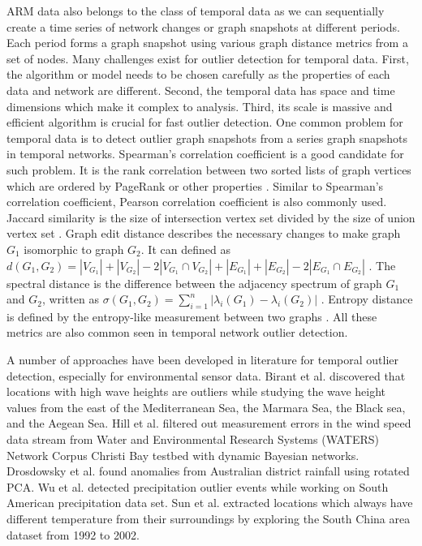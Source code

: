ARM data also belongs to the class of temporal data as we can sequentially create a
time series of network changes or graph snapshots at different periods.
Each period forms a graph snapshot using various graph distance metrics
from a set of nodes. Many challenges exist for outlier detection for
temporal data. First, the algorithm or model needs to be chosen
carefully as the properties of each data and network are different.
Second, the temporal data has space and time dimensions which make it
complex to analysis. Third, its scale is massive and efficient algorithm
is crucial for fast outlier detection. One common problem for temporal
data is to detect outlier graph snapshots from a series graph snapshots
in temporal networks. Spearman's correlation coefficient is a good
candidate for such problem. It is the rank correlation between two
sorted lists of graph vertices which are ordered by PageRank or other
properties \cite{papadimitriou2010web}. Similar to Spearman's
correlation coefficient, Pearson correlation coefficient is also
commonly used. Jaccard similarity is the size of intersection vertex set
divided by the size of union vertex set \cite{jay2012systematic}. Graph
edit distance describes the necessary changes to make graph $G_1$
isomorphic to graph $G_2$. It can defined as $d(G_1, G_2) = |V_{G_1}| +
|V_{G_2}| - 2|V_{G_1} \cap V_{G_2}| + |E_{G_1}| + |E_{G_2}| - 2|E_{G_1}
\cap E_{G_2}|$ \cite{papadimitriou2010web}. The spectral distance is the
difference between the adjacency spectrum of graph $G_1$ and $G_2$,
written as $\sigma(G_1, G_2) =
\displaystyle\sum_{i=1}^{n}|\lambda_i(G_1) - \lambda_i(G_2)|$
\cite{jovanovic2012spectral}. Entropy distance is defined by
the entropy-like measurement between two graphs
\cite{pincombe2005anomaly}. All these metrics are also common
seen in temporal network outlier detection.

A number of approaches have been developed in literature for temporal outlier detection,
especially for environmental sensor data. Birant et al.
\cite{kut2006spatio} discovered that locations with high wave heights
are outliers while studying the wave height values from the east of
the Mediterranean Sea, the Marmara Sea, the Black sea, and the
Aegean Sea. Hill et al. \cite{hill2007real, hill2010anomaly}
filtered out measurement errors in the wind speed data stream from
Water and Environmental Research Systems (WATERS) Network Corpus
Christi Bay testbed with dynamic Bayesian networks. Drosdowsky et
al. \cite{drosdowsky1993analysis} found anomalies from Australian
district rainfall using rotated PCA. Wu et al. \cite{wu2010spatio}
detected precipitation outlier events while working on South
American precipitation data set. Sun et al.
\cite{yuxiang2005detecting} extracted locations which always have
different temperature from their surroundings by exploring the
South China area dataset from 1992 to 2002.


